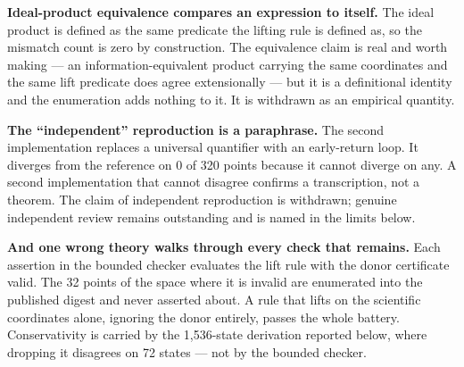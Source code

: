 \textbf{Ideal-product equivalence compares an expression to itself.} The ideal
product is defined as the same predicate the lifting rule is defined as, so the
mismatch count is zero by construction. The equivalence claim is real and worth
making --- an information-equivalent product carrying the same coordinates and the
same lift predicate does agree extensionally --- but it is a definitional identity
and the enumeration adds nothing to it. It is withdrawn as an empirical
quantity.

\textbf{The ``independent'' reproduction is a paraphrase.} The second implementation
replaces a universal quantifier with an early-return loop. It diverges from the
reference on 0 of 320 points because it cannot diverge on any. A second
implementation that cannot disagree confirms a transcription, not a theorem.
The claim of independent reproduction is withdrawn; genuine independent review
remains outstanding and is named in the limits below.

\textbf{And one wrong theory walks through every check that remains.} Each assertion
in the bounded checker evaluates the lift rule with the donor certificate valid.
The 32 points of the space where it is invalid are enumerated into the published
digest and never asserted about. A rule that lifts on the scientific coordinates
alone, ignoring the donor entirely, passes the whole battery. Conservativity is
carried by the 1,536-state derivation reported below, where dropping it
disagrees on 72 states --- not by the bounded checker.
